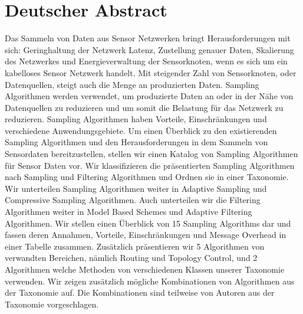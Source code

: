 \section*{Deutscher Abstract}
\begin{onehalfspace}
    Das Sammeln von Daten aus Sensor Netzwerken bringt Herausforderungen mit
    sich: Geringhaltung der Netzwerk Latenz, Zustellung genauer Daten,
    Skalierung des Netzwerkes und Energieverwaltung der Sensorknoten, wenn es
    sich um ein kabelloses Sensor Netzwerk handelt. Mit steigender Zahl von
    Sensorknoten, oder Datenquellen, steigt auch die Menge an produzierten
    Daten. Sampling Algorithmen werden verwendet, um produzierte Daten an oder
    in der Nähe von Datenquellen zu reduzieren und um somit die Belastung für
    das Netzwerk zu reduzieren. Sampling Algorithmen haben Vorteile,
    Einschränkungen und verschiedene Anwendungsgebiete. Um einen Überblick zu
    den existierenden Sampling Algorithmen und den Herausforderungen in dem
    Sammeln von Sensordaten bereitzustellen, stellen wir einen Katalog von
    Sampling Algorithmen für Sensor Daten vor. Wir klassifizieren die
    präsentierten Sampling Algorithmen nach Sampling und Filtering Algorithmen
    und Ordnen sie in einer Taxonomie. Wir unterteilen Sampling Algorithmen
    weiter in Adaptive Sampling und Compressive Sampling Algorithmen. Auch
    unterteilen wir die Filtering Algorithmen weiter in Model Based Schemes und
    Adaptive Filtering Algorithmen. Wir stellen einen Überblick von 15 Sampling
    Algorithms dar und fassen deren Annahmen, Vorteile, Einschränkungen und
    Message Overhead in einer Tabelle zusammen. Zusätzlich präsentieren wir 5
    Algorithmen von verwandten Bereichen, nämlich Routing und Topology Control,
    und 2 Algorithmen welche Methoden von verschiedenen Klassen unserer
    Taxonomie verwenden. Wir zeigen zusätzlich mögliche Kombinationen von
    Algorithmen aus der Taxonomie auf. Die Kombinationen sind teilweise von
    Autoren aus der Taxonomie vorgeschlagen.
\end{onehalfspace}
\clearpage


